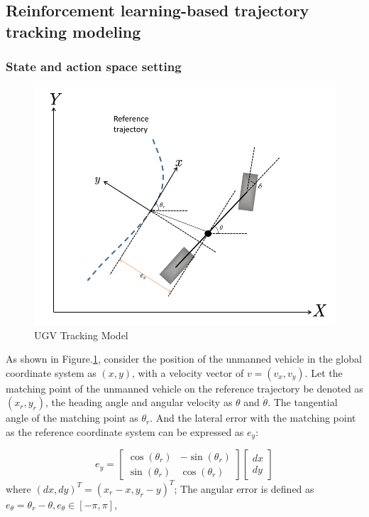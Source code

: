 \documentclass[sn-mathphys]{sn-jnl}%
\theoremstyle{thmstyleone}%
\theoremstyle{thmstyletwo}%
\theoremstyle{thmstylethree}%
\begin{document}
\subsection{Reinforcement learning-based trajectory tracking modeling}
\subsubsection{State and action space setting}  
\begin{figure}
	\centering
	\includegraphics[width=0.9\linewidth]{follow}
	\caption{UGV Tracking Model}
	\label{fig:follow}
\end{figure}


As shown in Figure.\ref{fig:follow}, consider the position of the unmanned vehicle in the global coordinate system as $ (x,y) $, with a velocity vector of $ v=(v_x,v_y)$.  Let the matching point of the unmanned vehicle on the reference trajectory be denoted as $ (x_r,y_r) $, the heading angle and angular velocity as $ \theta $ and $ \dot {\theta} $. The tangential angle of the matching point as $ \theta_r$. And the lateral error with the matching point as the reference coordinate system can be expressed as $ e_y $:

\begin{equation}
e_y=
\left[\begin{array}{ll}\cos \left(\theta_{r}\right) & -\sin \left(\theta_{r}\right) \\ \sin \left(\theta_{r}\right) & \cos \left(\theta_{r}\right)\end{array}\right]
\left[ 
\begin{array}{l}
dx \\
dy 
\end{array}
\right]
\end{equation}
where $(dx,dy)^T=(x_r-x,y_r-y)^T$;
The angular error is defined as$ e_{\theta}= \theta_r-\theta ,e_{\theta}\in [-\pi,\pi]$,
\end{document}
